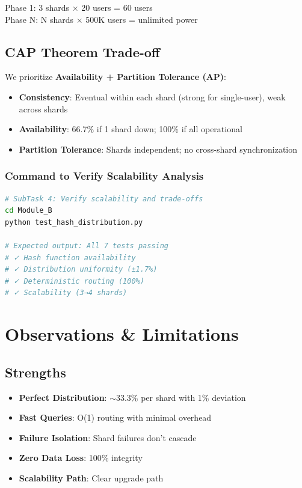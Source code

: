 \documentclass[11pt,a4paper]{article}
\begin{document}
Phase 1: 3 shards $\times$ 20 users = 60 users \\
Phase N: N shards $\times$ 500K users = unlimited power

\subsection*{CAP Theorem Trade-off}

We prioritize \textbf{Availability + Partition Tolerance (AP)}:

\begin{itemize}
    \item \textbf{Consistency}: Eventual within each shard (strong for single-user), weak across shards
    \item \textbf{Availability}: 66.7\% if 1 shard down; 100\% if all operational
    \item \textbf{Partition Tolerance}: Shards independent; no cross-shard synchronization
\end{itemize}

\subsubsection*{Command to Verify Scalability Analysis}

\begin{lstlisting}[language=bash]
# SubTask 4: Verify scalability and trade-offs
cd Module_B
python test_hash_distribution.py

# Expected output: All 7 tests passing
# ✓ Hash function availability
# ✓ Distribution uniformity (±1.7%)
# ✓ Deterministic routing (100%)
# ✓ Scalability (3→4 shards)
\end{lstlisting}

\section{Observations \& Limitations}

\subsection*{Strengths}

\begin{itemize}
    \item \textbf{Perfect Distribution}: $\sim$33.3\% per shard with 1\% deviation
    \item \textbf{Fast Queries}: O(1) routing with minimal overhead
    \item \textbf{Failure Isolation}: Shard failures don't cascade
    \item \textbf{Zero Data Loss}: 100\% integrity
    \item \textbf{Scalability Path}: Clear upgrade path
\end{itemize}
\end{document}
